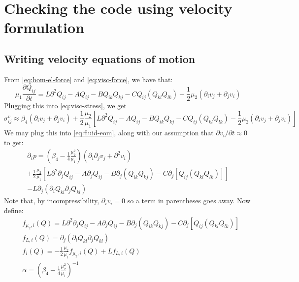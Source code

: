 \documentclass[reqno]{article}
\begin{document}
	\section{Checking the code using velocity formulation}
	\subsection{Writing velocity equations of motion}
	From \eqref{eq:hom-el-force} and \eqref{eq:visc-force}, we have that:
	\begin{equation}
		\mu_1 \frac{\partial Q_{ij}}{\partial t}
		= L\partial^2 Q_{ij} 
		- AQ_{ij} - BQ_{ik}Q_{kj} 
		- C Q_{ij} \left( Q_{kl}Q_{lk} \right) 
		- \frac12 \mu_2 \left(\partial_i v_j + \partial_j v_i\right)
	\end{equation}
	Plugging this into \eqref{eq:visc-stress}, we get
	\begin{equation}
		\sigma^v_{ij} \approx 
		\beta_4 \left(\partial_i v_j + \partial_j v_i\right)
		+ \frac12 \frac{\mu_2}{\mu_1} \left[
		L\partial^2 Q_{ij}
		- A Q_{ij}
		- B Q_{ik} Q_{kj}
		- C Q_{ij} \left( Q_{kl} Q_{lk} \right)
		- \frac12 \mu_2 \left( \partial_i v_j + \partial_j v_i \right)
		\right]
	\end{equation}
	We may plug this into \eqref{eq:fluid-eom}, along with our assumption that $\partial v_i/\partial t \approx 0$ to get:
	\begin{multline}
		\partial_i p = 
		\left( \beta_4 - \frac14 \frac{\mu_2^2}{\mu_1} \right)
		\left( \partial_i \partial_j v_j + \partial^2 v_i \right) \\
		+ \frac12 \frac{\mu_2}{\mu_1}
		\left[
		L \partial^2 \partial_j Q_{ij} 
		- A \partial_j Q_{ij}
		- B \partial_j \left( Q_{ik} Q_{kj} \right)
		- C\partial_j \left[ Q_{ij} \left( Q_{kl} Q_{lk} \right) \right]
		\right]\\
		- L\partial_j \left( \partial_i Q_{kl} \partial_j Q_{kl} \right)
	\end{multline}
	Note that, by incompressibility, $\partial_i v_i = 0$ so a term in parentheses goes away. Now define:
	\begin{align}
		&f_{\mu_2, i}(Q) = \label{eq:f_mu-equation}
		L \partial^2 \partial_j Q_{ij} 
		- A \partial_j Q_{ij}
		- B \partial_j \left( Q_{ik} Q_{kj} \right)
		- C\partial_j \left[ Q_{ij} \left( Q_{kl} Q_{lk} \right) \right] \\ 
		&f_{L, i} (Q) = \partial_j \left( \partial_i Q_{kl} \partial_j Q_{kl} \right) \label{eq:f_L-equation} \\ 
		&f_i (Q) = -\frac12 \frac{\mu_2}{\mu_1} f_{\mu_2, i} (Q) + L f_{L, i} (Q) \label{eq:f-equation} \\
		&\alpha = \left( \beta_4 - \frac14 \frac{\mu_2^2}{\mu_1} \right)^{-1}
	\end{align}
\end{document}
